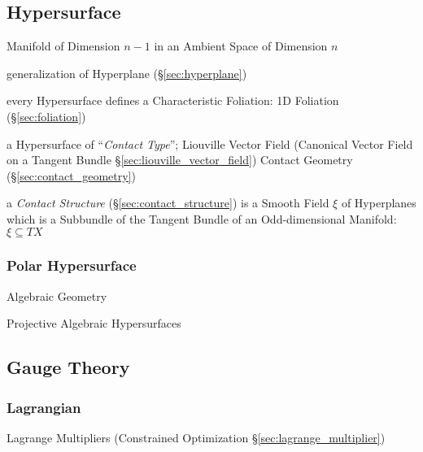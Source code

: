 \subsection{Hypersurface}\label{sec:hypersurface}


Manifold of Dimension $n-1$ in an Ambient Space of Dimension $n$

generalization of Hyperplane (\S\ref{sec:hyperplane})

every Hypersurface defines a Characteristic Foliation: 1D Foliation
(\S\ref{sec:foliation})

a Hypersurface of ``\emph{Contact Type}''; Liouville Vector Field (Canonical
Vector Field on a Tangent Bundle \S\ref{sec:liouville_vector_field}) \fist
Contact Geometry (\S\ref{sec:contact_geometry})

a \emph{Contact Structure} (\S\ref{sec:contact_structure}) is a Smooth Field
$\xi$ of Hyperplanes which is a Subbundle of the Tangent Bundle of an
Odd-dimensional Manifold: $\xi \subseteq T X$




\subsubsection{Polar Hypersurface}\label{sec:polar_hypersurface}

Algebraic Geometry

Projective Algebraic Hypersurfaces




\subsection{Gauge Theory}\label{sec:gauge_theory}


\subsubsection{Lagrangian}\label{sec:lagrangian}

\fist Lagrange Multipliers (Constrained Optimization
\S\ref{sec:lagrange_multiplier})


